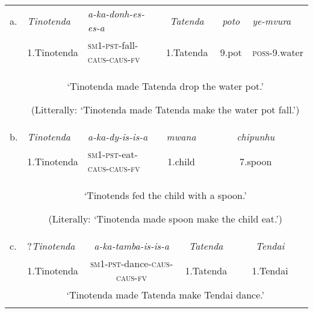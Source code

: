 \documentclass[output=paper]{langscibook}
\begin{document}
\tabletail{}
\tablelasttail{}
\begin{tabularx}{\textwidth}{XXXXXXXXX}
\lsptoprule
a. & {\itshape Tinotenda} & {\itshape a-ka-donh-es-es-a} & \multicolumn{3}{c}{{\itshape Tatenda}} & \multicolumn{2}{c}{{\itshape poto}} & {\itshape ye-mvura}\\
& 1.Tinotenda & \textsc{sm}1-\textsc{pst}{}-fall-\textsc{caus}{}-\textsc{caus}{}-\textsc{fv} & \multicolumn{3}{c}{1.Tatenda} & \multicolumn{2}{c}{9.pot} & \textsc{poss}{}-9.water\\
& \multicolumn{8}{c}{‘Tinotenda made Tatenda drop the water pot.’

(Litterally: ‘Tinotenda made Tatenda make the water pot fall.’)}\\
b. & \textit{Tinotenda} & {\itshape a-ka-dy-is-is-a} & \multicolumn{2}{c}{{\itshape mwana}} & \multicolumn{4}{c}{{\itshape chipunhu}}\\
& 1.Tinotenda & \textsc{sm}1-\textsc{pst}{}-eat-\textsc{caus}{}-\textsc{caus}{}-\textsc{fv} & \multicolumn{2}{c}{1.child} & \multicolumn{4}{c}{7.spoon}\\
& \multicolumn{8}{c}{‘Tinotends fed the child with a spoon.’

(Literally: ‘Tinotenda made spoon make the child eat.’)}\\
c. & ?\textit{Tinotenda} & \multicolumn{2}{c}{\textit{a-ka-tamba-is-is-a}} & \multicolumn{3}{c}{\textit{Tatenda}} & \multicolumn{2}{c}{\textit{Tendai}}\\
& 1.Tinotenda & \multicolumn{2}{c}{\textsc{sm}1-\textsc{pst}{}-dance-\textsc{caus}{}-\textsc{caus}{}-\textsc{fv}} & \multicolumn{3}{c}{1.Tatenda} & \multicolumn{2}{c}{1.Tendai}\\
& \multicolumn{8}{c}{‘Tinotenda made Tatenda make Tendai dance.’}\\
\lspbottomrule
\end{tabularx}
\z
\end{document}
